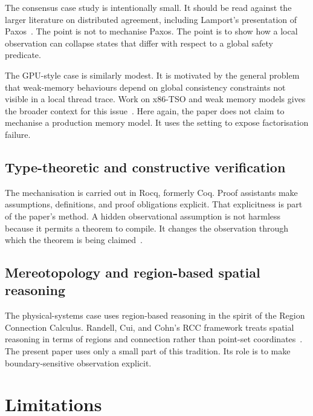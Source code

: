 \documentclass[a4paper,11pt]{article}
\begin{document}
The consensus case study is intentionally small. It should be read against the
larger literature on distributed agreement, including Lamport's presentation of
Paxos~\cite{lamport2001paxos}. The point is not to mechanise Paxos. The point is
to show how a local observation can collapse states that differ with respect to
a global safety predicate.

The GPU-style case is similarly modest. It is motivated by the general problem
that weak-memory behaviours depend on global consistency constraints not
visible in a local thread trace. Work on x86-TSO and weak memory models gives
the broader context for this issue~\cite{owens2009x86tso,alglave2014herding}.
Here again, the paper does not claim to mechanise a production memory model. It
uses the setting to expose factorisation failure.

\subsection{Type-theoretic and constructive verification}

The mechanisation is carried out in Rocq, formerly Coq. Proof assistants make
assumptions, definitions, and proof obligations explicit. That explicitness is
part of the paper's method. A hidden observational assumption is not harmless
because it permits a theorem to compile. It changes the observation through
which the theorem is being claimed~\cite{coq2024}.

\subsection{Mereotopology and region-based spatial reasoning}

The physical-systems case uses region-based reasoning in the spirit of the
Region Connection Calculus. Randell, Cui, and Cohn's RCC framework treats
spatial reasoning in terms of regions and connection rather than point-set
coordinates~\cite{randell1992rcc}. The present paper uses only a small part of
this tradition. Its role is to make boundary-sensitive observation explicit.

\section{Limitations}
\label{sec:limitations}
\end{document}

